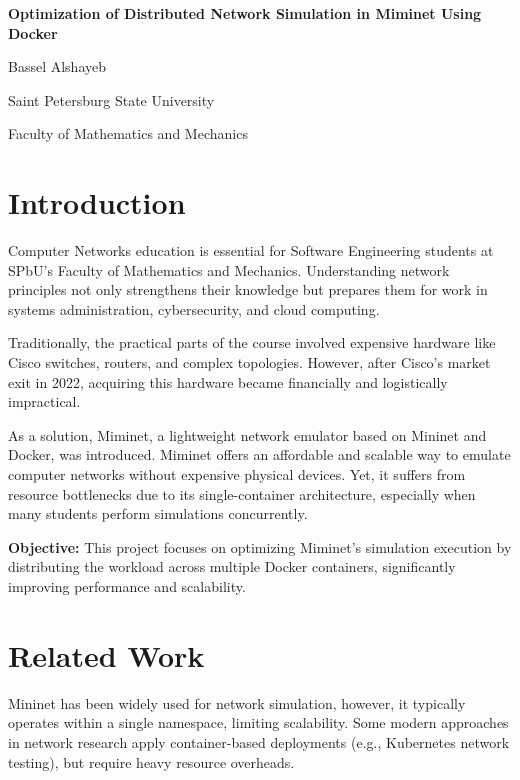 \documentclass[14pt]{article}
\begin{document}
\begin{titlepage}
    \centering
    \vspace*{1cm}
    \vspace{1cm}
    {\LARGE\sffamily\bfseries Optimization of Distributed Network Simulation in Miminet Using Docker\par}
    \vspace{2cm}
    \vspace{1cm}
    {\large\sffamily Bassel Alshayeb\par}
    {\large\sffamily Saint Petersburg State University\par}
    {\large\sffamily Faculty of Mathematics and Mechanics\par}

    \vfill
    {\large{}\par}
\end{titlepage}

\section{Introduction}
Computer Networks education is essential for Software Engineering students at SPbU's Faculty of Mathematics and Mechanics. Understanding network principles not only strengthens their knowledge but prepares them for work in systems administration, cybersecurity, and cloud computing.

Traditionally, the practical parts of the course involved expensive hardware like Cisco\cite{cisco} switches, routers, and complex topologies. However, after Cisco's\cite{cisco} market exit in 2022, acquiring this hardware became financially and logistically impractical.

As a solution, Miminet\cite{miminet}, a lightweight network emulator based on Mininet\cite{mininet} and Docker, was introduced. Miminet\cite{miminet} offers an affordable and scalable way to emulate computer networks without expensive physical devices. Yet, it suffers from resource bottlenecks due to its single-container architecture, especially when many students perform simulations concurrently.

\textbf{Objective:} This project focuses on optimizing Miminet's\cite{miminet} simulation execution by distributing the workload across multiple Docker containers, significantly improving performance and scalability.

\section{Related Work}
Mininet\cite{mininet} has been widely used for network simulation, however, it typically operates within a single namespace, limiting scalability. Some modern approaches in network research apply container-based deployments (e.g., Kubernetes network testing), but require heavy resource overheads.
\end{document}
